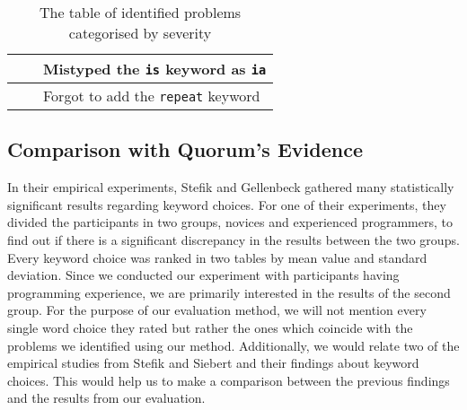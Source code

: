 \documentclass[preprint,10pt]{sigplanconf}
\begin{document}
\begin{table*}[]
\begin{minipage}[c]{\textwidth}
\begin{center}
\begin{tabular}{| p{5cm} | p{5cm} | p{5cm} |}
                                                           &                                                                    & Mistyped the \lstinline!is! keyword as \lstinline!ia!					                                   \\ \hline
                                                           &                                                                    & Forgot to add the \lstinline!repeat! keyword		                                                       \\ \hline
\end{tabular}
\end{center}
\caption{The table of identified problems categorised by severity}
\label{QuorumProblemResult}
\end{minipage}
\end{table*}

\subsection{Comparison with Quorum's Evidence}
In their empirical experiments, Stefik and Gellenbeck \cite{EmpStudiesonStimuli} gathered many statistically significant results regarding keyword choices. 
For one of their  experiments, they divided the participants in two groups, novices and experienced programmers, to find out if there is a significant discrepancy in the results between the two groups. Every keyword choice was ranked in two tables by mean value and standard deviation. Since we conducted our experiment with participants having programming experience, we are primarily interested in the results of the second group. For the purpose of our evaluation method, we will not mention every single word choice they rated but rather the ones which coincide with the problems we identified using our method.
Additionally, we would relate two of the empirical studies from Stefik and Siebert \cite{Empiricalinvestigation} and their findings about keyword choices. This would help us to make a comparison between the previous findings and the results from our evaluation.
\end{document}
